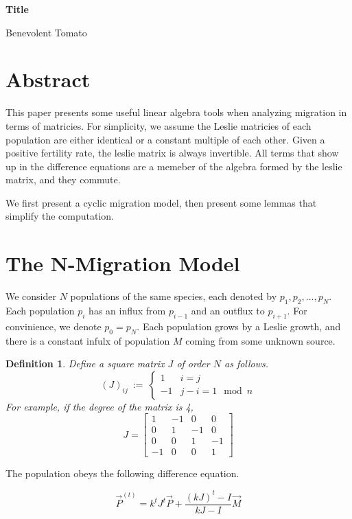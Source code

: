 \documentclass{article}
\newtheorem{definition}{Definition}
\begin{document}
\begin{center}
    \Large
    \textbf{Title}

    \large
    Benevolent Tomato
\end{center}

\section{Abstract}
This paper presents some useful linear algebra tools 
when analyzing migration in terms of matricies. 
For simplicity, we assume the Leslie matricies 
of each population are either identical or a constant 
multiple of each other. Given a positive fertility rate, 
the leslie matrix is always invertible. All terms that 
show up in the difference equations are a memeber of the 
algebra formed by the leslie matrix, and they commute. 

We first present a cyclic migration model, then 
present some lemmas that simplify the computation. 

\section{The N-Migration Model}
We consider $N$ populations of the same species, 
each denoted by $p_1, p_2, \dots, p_N$. Each 
population $p_i$ has an influx from $p_{i - 1}$ 
and an outflux to $p_{i + 1}$. For convinience, we denote 
$p_0 = p_N$. Each population grows by a Leslie growth, and 
there is a constant infulx of population $M$ coming from some 
unknown source. 

\begin{definition}
    Define a square matrix $J$ of 
    order $N$ as follows. 
    \[
    (J)_{ij} \ := \ 
    \begin{cases}
        1 & i = j \\ 
        -1 & j - i = 1 \mod n
    \end{cases}
    \]
    For example, if the degree of the matrix is 4, 
    \[
    J = \begin{bmatrix}
        1 & -1 & 0 & 0\\
        0 & 1 & -1 & 0 \\
        0 & 0 & 1 & -1 \\ 
        -1 & 0 & 0 & 1
    \end{bmatrix}
    \]
\end{definition}


The population obeys the following difference equation. 

\[
\vec P^{(t)} = 
k^t J^t \vec P + \frac 
{(kJ)^t - I}{kJ - I} \vec M 
\]
\end{document}
